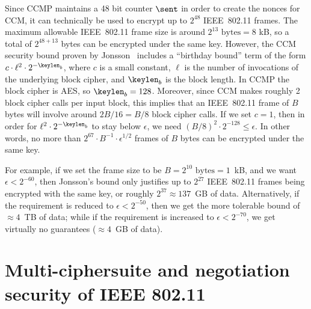 Since CCMP maintains a 48 bit counter $\sent$ in order to create the nonces for CCM,
it can technically be used to encrypt up to $2^{48}$ IEEE~802.11 frames.
The maximum allowable IEEE~802.11 frame size is around $2^{13} \text{ bytes} = 8$ kB,
so a total of $2^{48 + 13}$ bytes can be encrypted under the same key.
However,
the CCM security bound proven by Jonsson~\cite{SAC:Jonsson02} includes a ``birthday bound'' term of the form $c \cdot \ell^2 \cdot 2^{-\keylen_b}$,
where $c$ is a small constant,
$\ell$ is the number of invocations of the underlying block cipher,
and $\keylen_b$ is the block length.
In CCMP the block cipher is AES,
so $\keylen_b = 128$.
Moreover,
since CCM makes roughly 2 block cipher calls per input block,
this implies that an IEEE~802.11 frame of $B$ bytes will involve around  $2 B  / 16 = B / 8$ block cipher calls.
If we set $c = 1$,
then in order for $\ell^2 \cdot 2^{-\keylen_b}$ to stay below $\epsilon$,
we need $(B / 8)^2 \cdot 2^{-128} \leq \epsilon$.
In other words,
no more than $2^{67} \cdot B^{-1} \cdot \epsilon^{1/2}$ frames of $B$ bytes can be encrypted under the same key.


For example,
if we set the frame size to be $B = 2^{10} \text{ bytes} = 1$~kB,
and we want $\epsilon < 2^{-60}$,
then Jonsson's bound only justifies up to $2^{27}$  IEEE~802.11 frames being encrypted with the same key,
or roughly $2^{37} \approx 137$~GB of data.
Alternatively,
if the requirement is reduced to $\epsilon < 2^{-50}$,
then we get the more tolerable bound of $\approx 4$~TB of data;
while if the requirement is increased to $\epsilon < 2^{-70}$,
we get virtually no guarantees ($\approx 4$~GB of data).




\section{Multi-ciphersuite and negotiation security of IEEE 802.11}\label{sec:802.11:multi-cipher}

